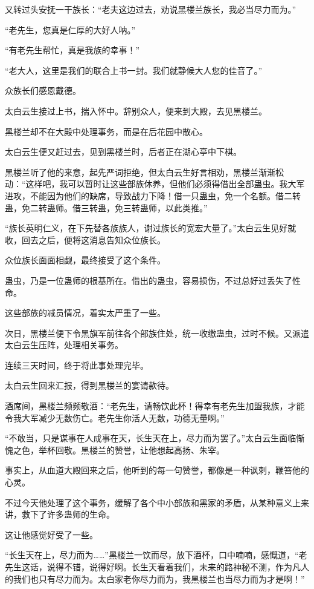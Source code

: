 \begin{this_body}
又转过头安抚一干族长：“老夫这边过去，劝说黑楼兰族长，我必当尽力而为。”

“老先生，您真是仁厚的大好人呐。”

“有老先生帮忙，真是我族的幸事！”

“老大人，这里是我们的联合上书一封。我们就静候大人您的佳音了。”

众族长们感恩戴德。

太白云生接过上书，揣入怀中。辞别众人，便来到大殿，去见黑楼兰。

黑楼兰却不在大殿中处理事务，而是在后花园中散心。

太白云生便又赶过去，见到黑楼兰时，后者正在湖心亭中下棋。

黑楼兰听了他的来意，起先严词拒绝，但太白云生好言相劝，黑楼兰渐渐松动：“这样吧，我可以暂时让这些部族休养，但他们必须得借出全部蛊虫。我大军进攻，不能因为他们的缺席，导致战力下降！借一只蛊虫，免一个名额。借二转蛊，免二转蛊师。借三转蛊，免三转蛊师，以此类推。”

“族长英明仁义，在下先替各族族人，谢过族长的宽宏大量了。”太白云生见好就收，回去之后，便将这消息告知众位族长。

众位族长面面相觑，最终接受了这个条件。

蛊虫，乃是一位蛊师的根基所在。借出的蛊虫，容易损伤，不过总好过丢失了性命。

这些部族的减员情况，着实太严重了一些。

次日，黑楼兰便下令黑旗军前往各个部族住处，统一收缴蛊虫，过时不候。又派遣太白云生压阵，处理相关事务。

连续三天时间，终于将此事处理完毕。

太白云生回来汇报，得到黑楼兰的宴请款待。

酒席间，黑楼兰频频敬酒：“老先生，请畅饮此杯！得幸有老先生加盟我族，才能令我大军减少无数伤亡。老先生你活人无数，功德无量啊。”

“不敢当，只是谋事在人成事在天，长生天在上，尽力而为罢了。”太白云生面临惭愧之色，举杯回敬。黑楼兰的赞誉，让他想起高扬、朱宰。

事实上，从血道大殿回来之后，他听到的每一句赞誉，都像是一种讽刺，鞭笞他的心灵。

不过今天他处理了这个事务，缓解了各个中小部族和黑家的矛盾，从某种意义上来讲，救下了许多蛊师的生命。

这让他感觉好受了一些。

“长生天在上，尽力而为……”黑楼兰一饮而尽，放下酒杯，口中喃喃，感慨道，“老先生这话，说得不错，说得好啊。长生天看着我们，未来的路神秘不测，作为凡人的我们也只有尽力而为。太白家老你尽力而为，我黑楼兰也当尽力而为才是啊！”


\end{this_body}
